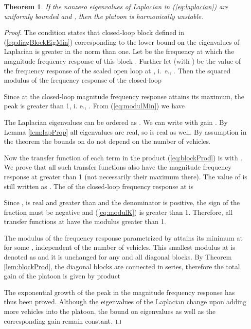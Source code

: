 \documentclass[technote, 10pt, twoside]{IEEEtran}
\theoremstyle{plain}
\newtheorem{theorem}{Theorem}
\theoremstyle{definition}
\theoremstyle{assump}
\begin{document}
\begin{theorem}
If the nonzero eigenvalues of Laplacian in (\ref{eq:laplacian}) are
uniformly bounded and , then the platoon is harmonically
unstable.
\label{thm:stringInstab}
\end{theorem}
 \begin{proof} The condition states that closed-loop block
  defined in (\ref{eq:diagBlockEigMin}) corresponding 
 to the lower bound on the eigenvalues of Laplacian is greater in the
  norm than one. Let  be the frequency at
 which the magnitude frequency response of this block . Further let 
 (with ) be the value of the frequency response of the scaled
 open loop  at , i.~e., . Then the squared modulus of the frequency
 response of the closed-loop  

Since at  the closed-loop magnitude frequency response attains its
maximum, the peak is greater than 1, i. e., . From (\ref{eq:modulMin}) we have
 
	
The Laplacian eigenvalues can be ordered as . We can write  with gain . By Lemma \ref{lem:lapProp} all eigenvalues are real, so  is real as well.
By assumption in the theorem the bounds on  do not depend on the number
of vehicles.

Now the transfer function of each term in the product (\ref{eq:blockProd}) is
 with
. We prove that all such
transfer functions also have the magnitude frequency response at 
greater than 1 (not necessarily their maximum there). The value of
 is still written as . The
 of the closed-loop frequency response
at  is

Since ,   is real and greater than  and
the denominator is positive, the sign of the fraction must be negative and
(\ref{eq:modulK}) is greater than 1. Therefore, all transfer functions
 at  have the modulus greater than 1.
	
The modulus of the frequency response parametrized by  attains its
minimum at  for some , independent of the number of
vehicles. This smallest modulus at  is denoted as
 and it is unchanged for any and all diagonal blocks. By Theorem
\ref{lem:blockProd}, the diagonal blocks are connected in series, therefore the
total gain of the platoon is given by product

The exponential growth of the peak in the magnitude frequency response has thus
been proved. Although the eigenvalues of the Laplacian change upon adding more
vehicles into the platoon, the bound on eigenvalues as well as the corresponding
gain  remain constant.
\end{proof} 
\end{document}
